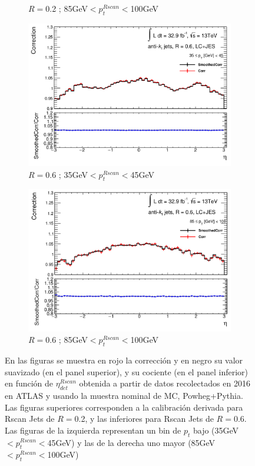 \begin{figure}[ht]
\begin{subfigure}[b]{0.495\textwidth}
        \caption{$R=$0.2 ; 85GeV$<p^{Rscan}_t<$100GeV}
    \end{subfigure}
    \vfill
    \begin{subfigure}[b]{0.495\textwidth}
        \centering
        \includegraphics[width=\textwidth]{images/Smo_6LC_ETA_1.png}
        \caption{$R=$0.6 ; 35GeV$<p_t^{Rscan}<$45GeV}
    \end{subfigure}
    \hfill
    \begin{subfigure}[b]{0.495\textwidth}
        \centering
        \includegraphics[width=\textwidth]{images/Smo_6LC_ETA_2.png}
        \caption{$R=$0.6 ; 85GeV$<p^{Rscan}_t<$100GeV}
    \end{subfigure}
    \caption{En las figuras se muestra en rojo la corrección y en negro su valor suavizado (en el panel superior), y su cociente (en el panel inferior) en función de $\eta^{Rscan}_{det}$ obtenida a partir de datos recolectados en 2016 en ATLAS y usando la muestra nominal de MC, Powheg+Pythia. Las figuras superiores corresponden a la calibración derivada para Rscan Jets de $R=$0.2, y las inferiores para Rscan Jets de $R=$0.6. Las figuras de la izquierda representan un bin de $p_t$ bajo (35GeV$<p_t^{Rscan}<$45GeV) y las de la derecha uno mayor (85GeV$<p^{Rscan}_t<$100GeV)} 
    \label{fig:SmoothervsEta}
\end{figure}

